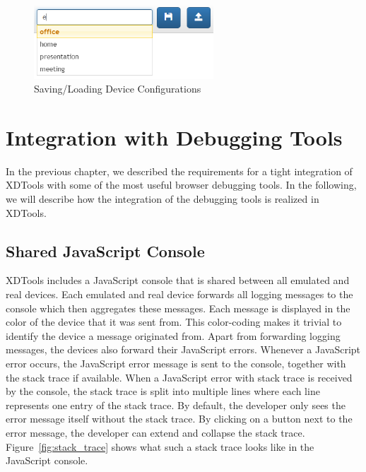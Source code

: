 \begin{figure}[H]
  \centering
    \includegraphics[width=0.6\textwidth]{images/screenshots/session_management_2.png}
	\caption[Screenshot: Saving/Loading device configurations]{Saving/Loading Device Configurations}
	\label{fig:session_management}
\end{figure}

\section{Integration with Debugging Tools}

In the previous chapter, we described the requirements for a tight integration of XDTools with some of the most useful browser debugging tools. In the following, we will describe how the integration of the debugging tools is realized in XDTools.

\subsection{Shared JavaScript Console}

XDTools includes a JavaScript console that is shared between all emulated and real devices. Each emulated and real device forwards all logging messages to the console which then aggregates these messages. Each message is displayed in the color of the device that it was sent from. This color-coding makes it trivial to identify the device a message originated from. Apart from forwarding logging messages, the devices also forward their JavaScript errors. Whenever a JavaScript error occurs, the JavaScript error message is sent to the console, together with the stack trace if available. When a JavaScript error with stack trace is received by the console, the stack trace is split into multiple lines where each line represents one entry of the stack trace. By default, the developer only sees the error message itself without the stack trace. By clicking on a button next to the error message, the developer can extend and collapse the stack trace. Figure~\ref{fig:stack_trace} shows what such a stack trace looks like in the JavaScript console.

